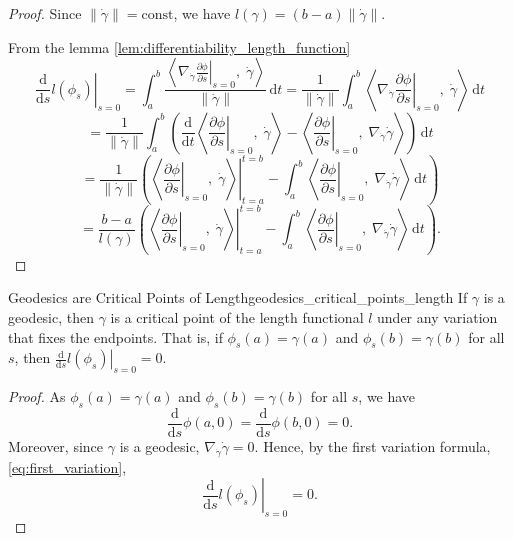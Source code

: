 \begin{proof}
Since $\|\dot{\gamma}\| = \mathrm{const}$, we have $l(\gamma) = (b-a)\|\dot{\gamma}\|$.

From the lemma \ref{lem:differentiability_length_function}
\[
\left.\frac{\mathrm{d}}{\mathrm{d}s} l(\phi_s)\right|_{s=0} = \int_a^b \frac{\left\langle \nabla_{\dot{\gamma}} \left.\frac{\partial \phi}{\partial s}\right|_{s=0},\; \dot{\gamma}\right\rangle}{\|\dot{\gamma}\|} \,\mathrm{d}t = \frac{1}{\|\dot{\gamma}\|} \int_a^b \left\langle \nabla_{\dot{\gamma}} \left.\frac{\partial \phi}{\partial s}\right|_{s=0},\; \dot{\gamma}\right\rangle \,\mathrm{d}t
\]
\[
= \frac{1}{\|\dot{\gamma}\|} \int_a^b \left(\frac{\mathrm{d}}{\mathrm{d}t}\left\langle \left.\frac{\partial \phi}{\partial s}\right|_{s=0},\; \dot{\gamma}\right\rangle - \left\langle \left.\frac{\partial \phi}{\partial s}\right|_{s=0},\; \nabla_{\dot{\gamma}} \dot{\gamma}\right\rangle\right) \,\mathrm{d}t
\]
\[
= \frac{1}{\|\dot{\gamma}\|} \left(\left.\left\langle \left.\frac{\partial \phi}{\partial s}\right|_{s=0},\; \dot{\gamma}\right\rangle\right|_{t=a}^{t=b} - \int_a^b \left\langle \left.\frac{\partial \phi}{\partial s}\right|_{s=0},\; \nabla_{\dot{\gamma}} \dot{\gamma}\right\rangle \,\mathrm{d}t\right)
\]
\[
= \frac{b-a}{l(\gamma)} \left(\left.\left\langle \left.\frac{\partial \phi}{\partial s}\right|_{s=0},\; \dot{\gamma}\right\rangle\right|_{t=a}^{t=b} - \int_a^b \left\langle \left.\frac{\partial \phi}{\partial s}\right|_{s=0},\; \nabla_{\dot{\gamma}} \dot{\gamma}\right\rangle \,\mathrm{d}t\right).
\]


\end{proof}


\begin{colorlem}{Geodesics are Critical Points of Length}{geodesics_critical_points_length}
If $\gamma$ is a geodesic, then $\gamma$ is a critical point of the length functional $l$ under any variation that fixes the endpoints. That is, if $\phi_s(a) = \gamma(a)$ and $\phi_s(b) = \gamma(b)$ for all $s$, then $\left.\frac{\mathrm{d}}{\mathrm{d}s} l(\phi_s)\right|_{s=0} = 0$.
\end{colorlem}

\begin{proof}
As $\phi_s(a) = \gamma(a)$ and $\phi_s(b) = \gamma(b)$ for all $s$, we have
$$
\frac{\mathrm{d}}{\mathrm{d}s} \phi(a,0)=
\frac{\mathrm{d}}{\mathrm{d}s} \phi(b,0)=0.
$$
Moreover, since $\gamma$ is a geodesic, $\nabla_{\dot{\gamma}} \dot{\gamma} = 0$. Hence, by the first variation formula, \eqref{eq:first_variation},
$$
\left.\frac{\mathrm{d}}{\mathrm{d}s} l(\phi_s)\right|_{s=0} 
= 0.
$$
\end{proof}






